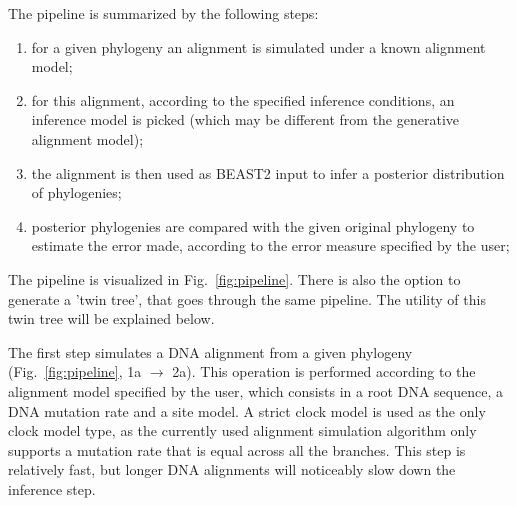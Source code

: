 \documentclass{article}
\begin{document}
The pipeline is summarized by the following steps:
\begin{enumerate}
    \item for a given phylogeny an alignment is simulated under a known 
alignment model;
    \item for this alignment, according to the specified inference conditions, 
an inference model is picked (which may be different from the generative 
alignment model);
    \item the alignment is then used as BEAST2 input to infer a posterior 
distribution of phylogenies;
    \item posterior phylogenies are compared with the given original phylogeny 
to estimate the error made, according to the error measure specified by the 
user;
\end{enumerate}
The pipeline is visualized in Fig.~\ref{fig:pipeline}. 
There is also the option to generate a 'twin tree', 
that goes through the same pipeline. 
The utility of this twin tree will be explained below.

The first step simulates a DNA alignment from a given 
phylogeny (Fig.~\ref{fig:pipeline}, 1a $\rightarrow$ 2a).
This operation is performed according to the alignment model 
specified by the user, which consists in a root DNA sequence, 
a DNA mutation rate and a site model.
A strict clock model is used as the only clock model
type, as the currently used alignment simulation algorithm
only supports a mutation rate that is equal across all the branches.
This step is relatively fast, 
but longer DNA alignments will noticeably slow down the inference step.
\end{document}

